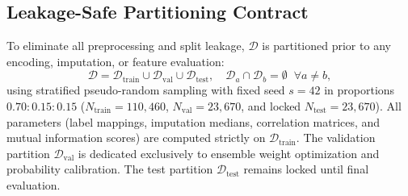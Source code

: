 \documentclass[10pt,journal,twocolumn]{IEEEtran}
\begin{document}
\subsection{Leakage-Safe Partitioning Contract}
To eliminate all preprocessing and split leakage, $\mathcal{D}$ is partitioned prior to any encoding, imputation, or feature evaluation:
\begin{equation}
\mathcal{D} = \mathcal{D}_{\text{train}} \cup \mathcal{D}_{\text{val}} \cup \mathcal{D}_{\text{test}}, \quad \mathcal{D}_a \cap \mathcal{D}_b = \emptyset \;\;\forall a \neq b,
\label{eq:split_def}
\end{equation}
using stratified pseudo-random sampling with fixed seed $s=42$ in proportions $0.70 : 0.15 : 0.15$ ($N_{\text{train}}=110,460$, $N_{\text{val}}=23,670$, and locked $N_{\text{test}}=23,670$). All parameters (label mappings, imputation medians, correlation matrices, and mutual information scores) are computed strictly on $\mathcal{D}_{\text{train}}$. The validation partition $\mathcal{D}_{\text{val}}$ is dedicated exclusively to ensemble weight optimization and probability calibration. The test partition $\mathcal{D}_{\text{test}}$ remains locked until final evaluation.
\end{document}
